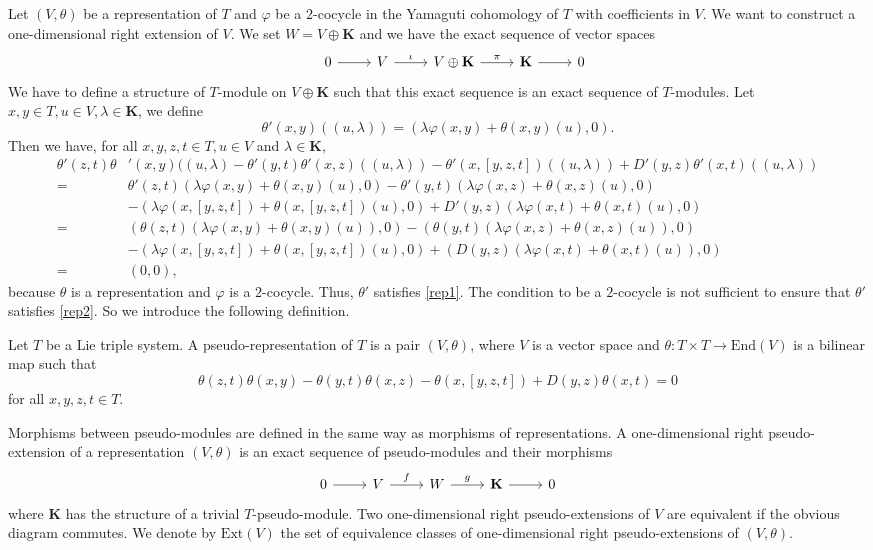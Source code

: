 \documentclass[11pt, twoside]{article}
\begin{document}
Let $(V,\theta)$ be a representation of $T$ and $\varphi$ be a $2$-cocycle in the Yamaguti cohomology of $T$ with coefficients in $V$. We want to construct a one-dimensional right extension of $V$. We set $W= V\oplus\mathbf{K} $ and we have the exact sequence of vector spaces \[\begin{tikzcd}
	& 0 & V & {V\oplus \mathbf{K}} & {\mathbf{K}} & 0 
	\arrow[from=1-2, to=1-3]
	\arrow["\iota", from=1-3, to=1-4]
	\arrow["\pi", from=1-4, to=1-5]
	\arrow[from=1-5, to=1-6]
\end{tikzcd}\] We have to define a structure of $T$-module on $V\oplus \mathbf{K}$ such that this exact sequence is an exact sequence of $T$-modules. Let $x,y\in T,u\in V,\lambda\in \mathbf{K}$, we define $$\theta'(x,y)((u,\lambda))= (\lambda\varphi(x,y)+ \theta(x,y)(u),0). $$ Then we have, for all $x,y,z,t\in T,u\in V$ and $\lambda\in\mathbf{K}$, \begin{align*}
    \theta'(z,t)\theta&'(x,y)((u,\lambda)- \theta'(y,t)\theta'(x,z)((u,\lambda))- \theta'(x,[y,z,t])((u,\lambda))+ D'(y,z)\theta'(x,t)((u,\lambda))\\ =& \theta'(z,t)(\lambda\varphi(x,y)+\theta(x,y)(u),0)- \theta'(y,t)(\lambda\varphi(x,z)+\theta(x,z)(u),0) \\& - (\lambda\varphi(x,[y,z,t])+\theta(x,[y,z,t])(u),0)+ D'(y,z)(\lambda\varphi(x,t)+\theta(x,t)(u),0)\\ =& (\theta(z,t)(\lambda\varphi(x,y)+\theta(x,y)(u)),0) - (\theta(y,t)( \lambda\varphi(x,z)+\theta(x,z)(u)),0)\\ &-(\lambda\varphi(x,[y,z,t])+\theta(x,[y,z,t])(u),0) + (D(y,z)(\lambda\varphi(x,t)+\theta(x,t)(u)),0)\\ =& (0,0), 
\end{align*} because $\theta$ is a representation and $\varphi$ is a $2$-cocycle. Thus, $\theta'$ satisfies \eqref{rep1}. The condition to be a $2$-cocycle is not sufficient to ensure that $\theta'$ satisfies \eqref{rep2}. So we introduce the following definition.




\begin{defi}
    Let $T$ be a Lie triple system. A pseudo-representation of $T$ is a pair $(V,\theta) $, where $V$ is a vector space and $\theta:T\times T\to \mathrm{End}(V)$ is a bilinear map such that  $$\theta(z,t)\theta(x,y)-\theta(y,t)\theta(x,z)-\theta(x,[y,z,t]) + D(y,z)\theta(x,t)=0$$ for all $x,y,z,t\in T$.
\end{defi}

Morphisms between pseudo-modules are defined in the same way as morphisms of representations.  A one-dimensional right pseudo-extension of a representation $(V,\theta)$ is an exact sequence of pseudo-modules and their morphisms \[\begin{tikzcd}
	0 & V & W & {\mathbf{K}} & 0
	\arrow[from=1-1, to=1-2]
	\arrow["f", from=1-2, to=1-3]
	\arrow["g", from=1-3, to=1-4]
	\arrow[from=1-4, to=1-5]
\end{tikzcd}\] where $\mathbf{K}$ has the structure of a trivial $T$-pseudo-module. Two one-dimensional right pseudo-extensions of $V$ are equivalent if the obvious diagram commutes. We denote by $\mathrm{Ext}(V) $ the set of equivalence classes of one-dimensional right pseudo-extensions of $(V,\theta)$.
\end{document}
